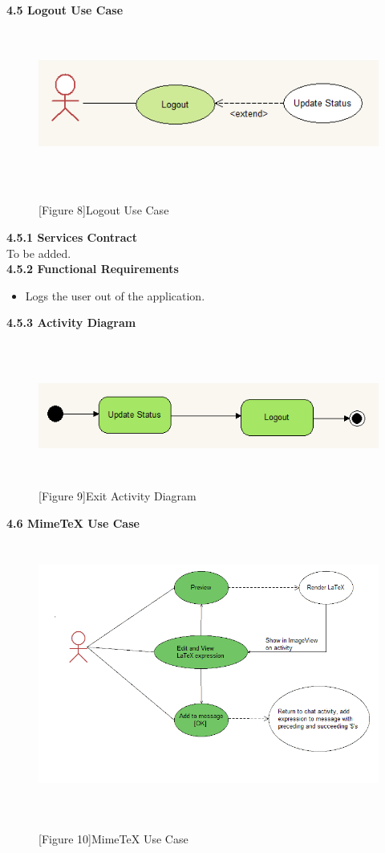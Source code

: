 \documentclass[29pt,a4paper]{moderncv}
\begin{document}
\newpage
	\left\textbf{4.5 Logout Use Case}
		\begin{figure}
			\centering
			\\ \includegraphics[width=6.0in, height=1.5in]{./ucLogout.png}
			\\\caption{[Figure 8]Logout Use Case}\\
		\end{figure}
		
		\noindent\textbf{4.5.1 Services Contract}\\ 
		To be added.\\
		\textbf{4.5.2 Functional Requirements}
			\begin{itemize}
				\item Logs the user out of the application.\\
			\end{itemize}
		
		\newpage
		\left\textbf{4.5.3 Activity Diagram}
				\begin{figure}
					\centering
					\\ \includegraphics[width=5.0in, height=1.5in]{./acLogout.png}
					\\\caption{[Figure 9]Exit Activity Diagram}
				\end{figure}
		
\newpage		
	\left\textbf{4.6 MimeTeX Use Case}
		\begin{figure}
			\centering
			\\ \includegraphics[width=6.0in, height=3.0in]{./MimeTeXUseCase.png}
			\\\caption{[Figure 10]MimeTeX Use Case}\\
		\end{figure}
		
\end{document}
